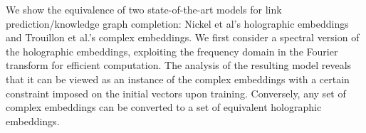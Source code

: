 We show the equivalence of two state-of-the-art models for link prediction/knowledge graph completion: Nickel et al's holographic embeddings and Trouillon et al.'s complex embeddings. We first consider a spectral version of the holographic embeddings, exploiting the frequency domain in the Fourier transform for efficient computation. The analysis of the resulting model reveals that it can be viewed as an instance of the complex embeddings with a certain constraint imposed on the initial vectors upon training. Conversely, any set of complex embeddings can be converted to a set of equivalent holographic embeddings.
